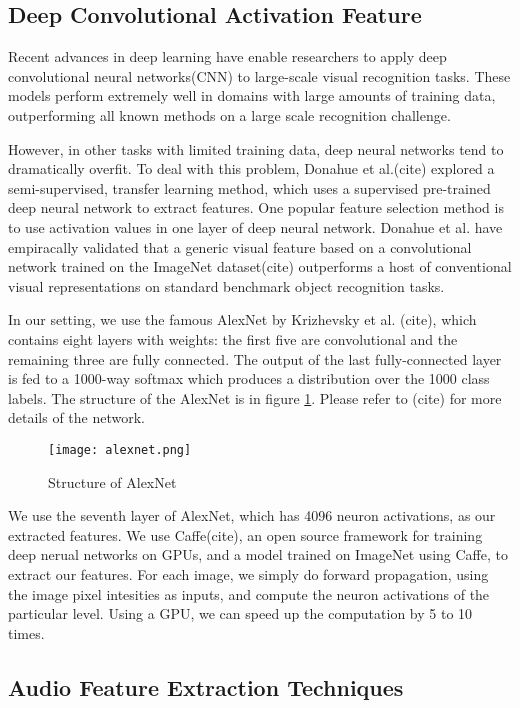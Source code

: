 \subsection{Deep Convolutional Activation Feature}
Recent advances in deep learning have enable researchers to apply deep convolutional neural networks(CNN) to large-scale visual recognition tasks. These models perform extremely well in domains with large amounts of training data, outperforming all known methods on a large scale recognition challenge.\par
However, in other tasks with limited training data, deep neural networks tend to dramatically overfit. To deal with this problem, Donahue et al.(cite) explored a semi-supervised, transfer learning method, which uses a supervised pre-trained deep neural network to extract features. One popular feature selection method is to use activation values in one layer of deep neural network. Donahue et al. have empiracally validated that a generic visual feature based on a convolutional network trained on the ImageNet dataset(cite) outperforms a host of conventional visual representations on standard benchmark object recognition tasks.\par
In our setting, we use the famous AlexNet by Krizhevsky et al. (cite), which contains eight layers with weights: the first five are convolutional and the remaining three are fully connected. The output of the last fully-connected layer is fed to a 1000-way softmax which produces a distribution over the 1000 class labels. The structure of the AlexNet is in figure \ref{fig:alexnet}. Please refer to (cite) for more details of the network. \par

\begin{figure}
\texttt{[image: alexnet.png]}
\label{fig:alexnet}
\caption{Structure of AlexNet}
\end{figure}

We use the seventh layer of AlexNet, which has 4096 neuron activations, as our extracted features. We use Caffe(cite), an open source framework for training deep nerual networks on GPUs, and a model trained on ImageNet using Caffe, to extract our features. For each image, we simply do forward propagation, using the image pixel intesities as inputs, and compute the neuron activations of the particular level. Using a GPU, we can speed up the computation by 5 to 10 times.

\subsection{Audio Feature Extraction Techniques}
